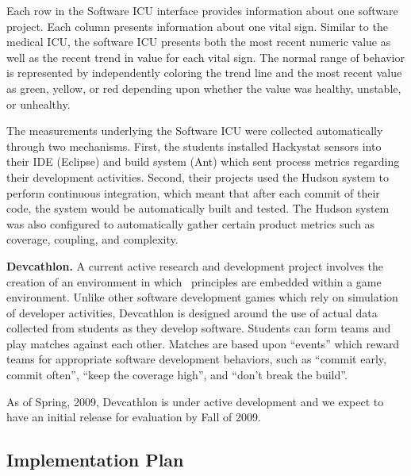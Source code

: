 Each row in the Software ICU interface provides information about one
software project.  Each column presents information about one vital
sign. Similar to the medical ICU, the software ICU presents both the most
recent numeric value as well as the recent trend in value for each vital
sign.  The normal range of behavior is represented by independently
coloring the trend line and the most recent value as green, yellow, or red
depending upon whether the value was healthy, unstable, or unhealthy.

The measurements underlying the Software ICU were collected automatically
through two mechanisms. First, the students installed Hackystat sensors
into their IDE (Eclipse) and build system (Ant) which sent process
metrics regarding their development activities.  Second, their projects
used the Hudson system to perform continuous integration, which meant that
after each commit of their code, the system would be automatically built
and tested.  The Hudson system was also configured to automatically gather
certain product metrics such as coverage, coupling, and complexity.

{\bf Devcathlon.} A current active research and development project
involves the creation of an environment in which \eCT\ principles are
embedded within a game environment.  Unlike other software development
games which rely on simulation of developer activities, Devcathlon is
designed around the use of actual data collected from students as they
develop software.  Students can form teams and play matches against each
other.  Matches are based upon ``events'' which reward teams for
appropriate software development behaviors, such as ``commit early, commit
often'', ``keep the coverage high'', and ``don't break the build''.

As of Spring, 2009, Devcathlon is under active development and we expect to
have an initial release for evaluation by Fall of 2009.


\subsection{Implementation Plan}
\label{sec:implementation}



